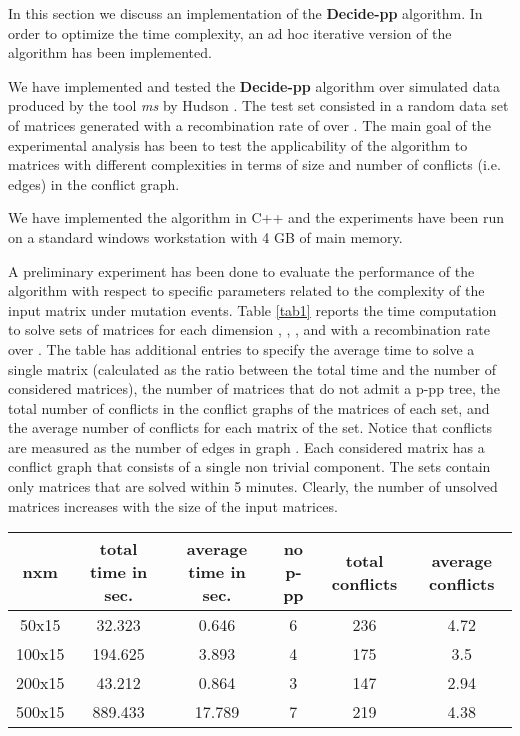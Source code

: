\documentclass{llncs}
\newcommand{\pp}{Decide-pp}
\begin{document}
In  this section we discuss an implementation of  the {\bf  \pp} algorithm. In order to optimize the time complexity, an ad hoc  iterative version of the algorithm has been implemented.


We have implemented  and tested the {\bf  \pp} algorithm over simulated data produced by  the tool  \textit{ms} by Hudson \cite{Hu}.   The test set consisted in a random data set of matrices generated with a recombination rate of  over .  The main goal of the experimental analysis has been to test the applicability of the algorithm to matrices with different complexities in terms of size and number of conflicts (i.e. edges)  in the conflict graph.

We have implemented the algorithm   in C++ and the 
experiments have been run on a standard windows workstation with 4 GB of main memory. 

A preliminary experiment has been done to evaluate the performance of the algorithm with respect to specific parameters related 
to the complexity of the input matrix under mutation events.
Table \ref{tab1} reports  the time computation to solve sets of  matrices for each dimension ,  ,  , and   with a recombination rate  over . 
The table has additional entries to specify  the average time to solve a single matrix (calculated as the ratio between the total time and the number of considered matrices), the  number of matrices that do not admit a p-pp tree, the total number of conflicts in the conflict graphs of the matrices of each set, and the average number of conflicts for each matrix of the set.  Notice that conflicts are measured as the number of edges in graph .
Each considered matrix has a conflict graph   that consists of a single 
non trivial component. The sets contain only matrices that are solved within 5 minutes. Clearly, the number of unsolved matrices increases with the size of the input matrices.

\begin{table*}
\caption{Summary table}
\label{tab1}
\centering
\begin{scriptsize}
\begin{tabular}{|c|c|c|c|c|c|}
\hline
 {\bf nxm} & {\bf  total time in sec. } & {\bf average time in sec.} & {\bf no p-pp} & {\bf total conflicts} & {\bf average conflicts} \\
\hline
     50x15 &         32.323 &    0.646    &     6    &     236   & 4.72   \\
     100x15 &    194.625      &   3.893    &    4     &    175  & 3.5     \\
     200x15 &    43.212     &     0.864   &     3     &     147  & 2.94    \\
     500x15 &    889.433     &    17.789    &    7      &    219 & 4.38      \\
\hline
\end{tabular}
\end{scriptsize}
\end{table*}  
\end{document}
